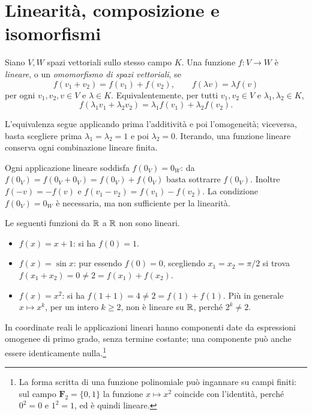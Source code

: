 \section{Linearità, composizione e isomorfismi}
\begin{definizione}
Siano $V,W$ spazi vettoriali sullo stesso campo $K$. Una funzione $f:V\to W$ è \emph{lineare}, o un \emph{omomorfismo di spazi vettoriali}, se
\[
 f(v_1+v_2)=f(v_1)+f(v_2),\qquad f(\lambda v)=\lambda f(v)
\]
per ogni $v_1,v_2,v\in V$ e $\lambda\in K$. Equivalentemente, per tutti $v_1,v_2\in V$ e $\lambda_1,\lambda_2\in K$,
\[
 f(\lambda_1v_1+\lambda_2v_2)=\lambda_1f(v_1)+\lambda_2f(v_2).
\]
\end{definizione}
L'equivalenza segue applicando prima l'additività e poi l'omogeneità; viceversa, basta scegliere prima $\lambda_1=\lambda_2=1$ e poi $\lambda_2=0$. Iterando, una funzione lineare conserva ogni combinazione lineare finita.

\begin{osservazione}
Ogni applicazione lineare soddisfa $f(0_V)=0_W$: da $f(0_V)=f(0_V+0_V)=f(0_V)+f(0_V)$ basta sottrarre $f(0_V)$. Inoltre $f(-v)=-f(v)$ e $f(v_1-v_2)=f(v_1)-f(v_2)$. La condizione $f(0_V)=0_W$ è necessaria, ma non sufficiente per la linearità.
\end{osservazione}
\begin{esempio}
Le seguenti funzioni da $\mathbb{R}$ a $\mathbb{R}$ non sono lineari.
\begin{itemize}
\item $f(x)=x+1$: si ha $f(0)=1$.
\item $f(x)=\sin x$: pur essendo $f(0)=0$, scegliendo $x_1=x_2=\pi/2$ si trova $f(x_1+x_2)=0\ne2=f(x_1)+f(x_2)$.
\item $f(x)=x^2$: si ha $f(1+1)=4\ne2=f(1)+f(1)$. Più in generale $x\mapsto x^k$, per un intero $k\geq2$, non è lineare su $\mathbb{R}$, perché $2^k\ne2$.
\end{itemize}
In coordinate reali le applicazioni lineari hanno componenti date da espressioni omogenee di primo grado, senza termine costante; una componente può anche essere identicamente nulla.\footnote{La forma scritta di una funzione polinomiale può ingannare su campi finiti: sul campo $\mathbf F_2=\{0,1\}$ la funzione $x\mapsto x^2$ coincide con l'identità, perché $0^2=0$ e $1^2=1$, ed è quindi lineare.}
\end{esempio}

